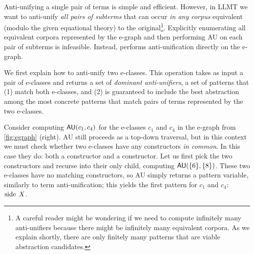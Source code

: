 Anti-unifying
  a single pair of terms is simple and efficient.
However,
  in LLMT we want to anti-unify \emph{all pairs of subterms}
  that can occur \emph{in any corpus} equivalent
  (modulo the given equational theory)
  to the original\footnote{
      A careful reader might be wondering if
        we need to compute infinitely many anti-unifiers
        because there might be infinitely many equivalent corpora.
      As we explain shortly,
        there are only finitely many patterns that
        are viable abstraction candidates.
    }.
Explicitly enumerating all equivalent corpora
  represented by the e-graph and then
  performing AU on each pair of subterms
  is infeasible.
Instead, \tool performs
  anti-unification directly on the e-graph.

%
We first explain how to
  anti-unify two e-classes.
This operation takes as input a pair of e-classes and
  returns a set of \emph{dominant anti-unifiers},
  \ie a set of patterns that
    (1) match both e-classes, and
    (2) is guaranteed to include
      the best abstraction 
      among the most concrete patterns 
      that match pairs of terms represented by the two e-classes.


Consider computing $\mathsf{AU}(c_1, c_4)$
  for the e-classes $c_1$ and $c_4$ in
  the e-graph from \autoref{fig:egraph} (right).
AU still proceeds as a top-down traversal,
  but in this context we must
  check whether two e-classes have
  any constructors \emph{in common}.
In this case they do:
  both a  constructor and a  constructor.
Let us first pick the two  constructors
  and recurse into their only child,
  computing $\au(\{\T{6}\}, \{\T{8}\})$.
These two e-classes have
  no matching constructors,
  so AU simply returns a pattern variable,
  similarly to term anti-unification;
  this yields the first pattern for $c_1$ and $c_4$: $\T{side}\ X$.
  
